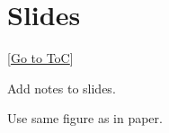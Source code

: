 \documentclass[[a4paper,12pt]{article}
\newcommand{\gototoc}{\vspace{-1.8cm} \null\hfill [\hyperlink{toc}{Go to ToC}] \newline}
\begin{document}
\section{Slides}
\gototoc
\begin{todolist}
	\item Add notes to slides.
	\item Use same figure as in paper.
\end{todolist}


\clearpage
\hypertarget{toc}{}								%
\tableofcontents
\vspace{2.5\bigskipamount}
\end{document}

